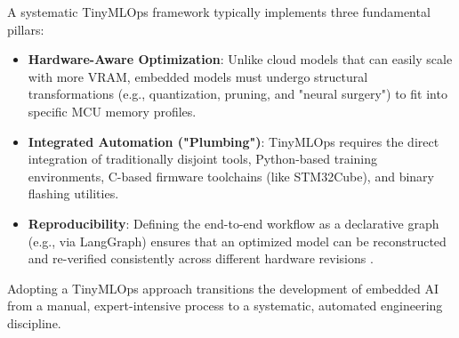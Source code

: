 A systematic TinyMLOps framework typically implements three fundamental pillars:

\begin{itemize}
    \item \textbf{Hardware-Aware Optimization}: Unlike cloud models that can easily scale with more VRAM, embedded models must undergo structural transformations (e.g., quantization, pruning, and "neural surgery") to fit into specific MCU memory profiles.

    \item \textbf{Integrated Automation ("Plumbing")}: TinyMLOps requires the direct integration of traditionally disjoint tools, Python-based training environments, C-based firmware toolchains (like STM32Cube), and binary flashing utilities.

    \item \textbf{Reproducibility}: Defining the end-to-end workflow as a declarative graph (e.g., via LangGraph) ensures that an optimized model can be reconstructed and re-verified consistently across different hardware revisions \cite{wang2024agentailanggraphmodular}.
\end{itemize}

Adopting a TinyMLOps approach transitions the development of embedded AI from a manual, expert-intensive process to a systematic, automated engineering discipline.
